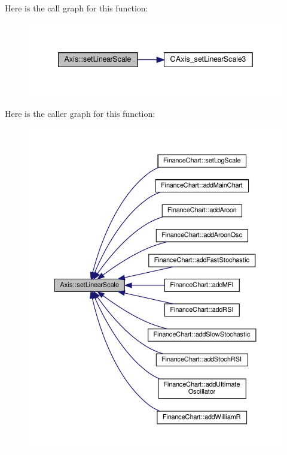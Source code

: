 Here is the call graph for this function\+:
\nopagebreak
\begin{figure}[H]
\begin{center}
\leavevmode
\includegraphics[width=342pt]{class_axis_a69fe2919bd8bcf21a5139dc1e0a511c4_cgraph}
\end{center}
\end{figure}
Here is the caller graph for this function\+:
\nopagebreak
\begin{figure}[H]
\begin{center}
\leavevmode
\includegraphics[width=350pt]{class_axis_a69fe2919bd8bcf21a5139dc1e0a511c4_icgraph}
\end{center}
\end{figure}
\mbox{\label{class_axis_af149d48d3168531e48ef42f99695b8b7}} 
